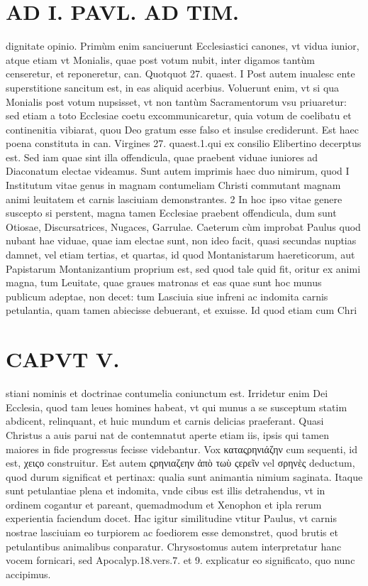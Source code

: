 \documentclass{article}
\begin{document}
\begin{pages}
\section*{AD I. PAVL. AD TIM. }
\marginpar{[ p.202 ]}\pstart dignitate opinio. Primùm enim sanciuerunt Ecclesiastici canones, vt vidua iunior, atque etiam vt Monialis, quae post votum nubit, inter digamos tantùm censeretur, et reponeretur, can. Quotquot 27. quaest. I Post autem inualesc ente superstitione sancitum est, in eas aliquid acerbius. Voluerunt enim, vt si qua Monialis post votum nupsisset, vt non tantùm Sacramentorum vsu priuaretur: sed etiam a toto Ecclesiae coetu excommunicaretur, quia votum de coelibatu et continenitia vibiarat, quou Deo gratum esse falso et insulse crediderunt. Est haec poena constituta in can. Virgines 27. quaest.1.qui ex consilio Elibertino decerptus est.  \pend\pstart Sed iam quae sint illa offendicula, quae praebent viduae iuniores ad Diaconatum electae videamus. Sunt autem imprimis haec duo nimirum, quod I Institutum vitae genus in magnam contumeliam Christi commutant magnam animi leuitatem et carnis lasciuiam demonstrantes. 2 In hoc ipso vitae genere suscepto si perstent, magna tamen Ecclesiae praebent offendicula, dum sunt Otiosae, Discursatrices, Nugaces, Garrulae. Caeterum cùm improbat Paulus quod nubant hae viduae, quae iam electae sunt, non ideo facit, quasi secundas nuptias damnet, vel etiam tertias, et quartas, id quod Montanistarum haereticorum, aut Papistarum Montanizantium proprium est, sed quod tale quid fit, oritur ex animi magna, tum Leuitate, quae graues matronas et eas quae sunt hoc munus publicum adeptae, non decet: tum Lasciuia siue infreni ac indomita carnis petulantia, quam tamen abiecisse debuerant, et exuisse. Id quod etiam cum Chri\pend
\section*{CAPVT V. }
\marginpar{[ p.283 ]}\pstart stiani nominis et doctrinae contumelia coniunctum est. Irridetur enim Dei Ecclesia, quod tam leues homines habeat, vt qui munus a se susceptum statim abdicent, relinquant, et huic mundum et carnis delicias praeferant. Quasi Christus a auis parui nat de contemnatut aperte etiam iis, ipsis qui tamen maiores in fide progressus fecisse videbantur.  \pend\pstart Vox καταςρηνιάζην cum sequenti, id est, χειςο construitur. Est autem ςρηνιαζεην ἀπὸ τωὺ ςερεῖν vel σρηνὲς deductum, quod durum significat et pertinax: qualia sunt animantia nimium saginata. Itaque sunt petulantiae plena et indomita, vnde cibus est illis detrahendus, vt in ordinem cogantur et pareant, quemadmodum et Xenophon et ipla rerum experientia faciendum docet. Hac igitur similitudine vtitur Paulus, vt carnis nostrae lasciuiam eo turpiorem ac foediorem esse demonstret, quod brutis et petulantibus animalibus conparatur.  \pend\pstart Chrysostomus autem interpretatur hanc vocem fornicari, sed Apocalyp.18.vers.7. et 9. explicatur eo significato, quo nunc accipimus.  \pend
{}
{}

\end{pages}
\end{document}
